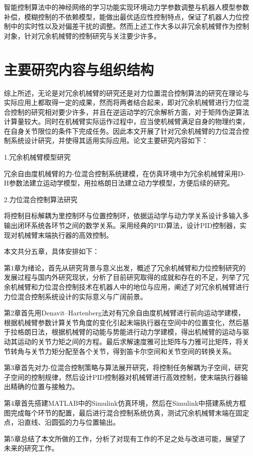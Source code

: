 \documentclass[12pt,a4paper,openany,oneside]{book}%
\numberwithin{equation}{chapter}%
\numberwithin{figure}{chapter}%
\begin{document}
智能控制算法中的神经网络的学习功能实现环境动力学参数调整与机器人模型参数补偿，模糊控制的不依赖模型，能做出最优适应性控制特点，保证了机器人力位控制中的实时性以及对偏差干扰的调整。然而上述工作大多以非冗余机械臂作为控制对象，针对冗余机械臂的控制研究与关注要少许多。

\section{主要研究内容与组织结构}
综上所述，无论是对冗余机械臂的研究还是对力位置混合控制算法的研究在理论与实际应用上都取得一定的成果，然而将两者结合起来，即对冗余机械臂进行力位混合控制的研究相对要少许多，并且在逆运动学的冗余解析方面，对于矩阵伪逆算法计算量较大。同时在机械臂实际运作过程中，应当使机械臂满足自身的物理约束，在自身关节限位的条件下完成任务。因此本文开展了针对冗余机械臂的力位混合控制系统设计研究，并使得其适用实际应用。论文主要研究内容如下：

1.冗余机械臂模型研究

冗余自由度机械臂的力-位混合控制系统建模，在仿真环境中为冗余机械臂采用D-H参数法建立运动学模型，用拉格朗日法建立动力学模型，方便后续的研究。

2.力位混合控制算法研究

将控制目标解耦为里控制环与位置控制环，依据运动学与动力学关系设计多输入多输出闭环系统各环节之间的数学关系。采用经典的PID算法，设计PID控制器，实现对机械臂末端执行器的高效控制。

本文共分五章，具体安排如下：\par
第1章为绪论，首先从研究背景与意义出发，概述了冗余机械臂和力位控制研究的发展过程与国内外研究现状，分析了目前研究取得的成就和存在的不足，列举了冗余机械臂和力位混合控制技术在机器人中的地位与应用，阐述了对冗余机械臂进行力位混合控制系统设计的实际意义与广阔前景。\par
第2章首先用Denavit–Hartenberg法对有冗余自由度机械臂进行前向运动学建模，根据机械臂参数计算关节角度的变化引起末端执行器在空间中的位置变化，然后基于拉格朗日法，根据机械臂的动能与势能进行动力学建模，得出机械臂的运动与驱动其运动的关节力矩之间的方程。最后求解速度雅可比矩阵与力雅可比矩阵，将关节转角与关节力矩分配至各个关节，得到笛卡尔空间和关节空间的转换关系。\par
第3章首先对力-位混合控制策略与算法展开研究，将控制任务解耦为子空间，研究子空间的控制规律，然后设计PID控制器对机械臂进行高效控制，使末端执行器输出精确的位置与接触力。\par
第4章首先搭建MATLAB中的Simulink仿真环境，然后在Simulink中搭建系统方框图完成每个环节的配置，最后进行混合控制系统仿真，测试冗余机械臂末端在固定点，沿直线、沿圆弧的力与位置输出。\par
第5章总结了本文所做的工作，分析了对现有工作的不足之处与改进可能，展望了未来的研究工作。
\end{document}

